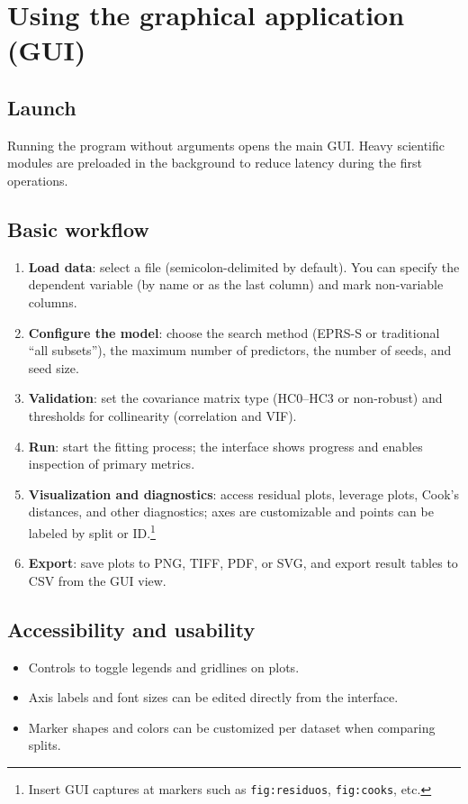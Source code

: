 \documentclass[11pt,a4paper]{article}
\begin{document}
\section{Using the graphical application (GUI)}
\subsection{Launch}
Running the program without arguments opens the main GUI. Heavy scientific modules are preloaded in the background to reduce latency during the first operations.\cite{mlrx-source-main}

\subsection{Basic workflow}
\begin{enumerate}
  \item \textbf{Load data}: select a file (semicolon-delimited by default). You can specify the dependent variable (by name or as the last column) and mark non-variable columns.
  \item \textbf{Configure the model}: choose the search method (EPRS-S or traditional ``all subsets''), the maximum number of predictors, the number of seeds, and seed size.
  \item \textbf{Validation}: set the covariance matrix type (HC0--HC3 or non-robust) and thresholds for collinearity (correlation and VIF).
  \item \textbf{Run}: start the fitting process; the interface shows progress and enables inspection of primary metrics.
  \item \textbf{Visualization and diagnostics}: access residual plots, leverage plots, Cook's distances, and other diagnostics; axes are customizable and points can be labeled by split or ID.\footnote{Insert GUI captures at markers such as \texttt{fig:residuos}, \texttt{fig:cooks}, etc.}
  \item \textbf{Export}: save plots to PNG, TIFF, PDF, or SVG, and export result tables to CSV from the GUI view.
\end{enumerate}

\subsection{Accessibility and usability}
\begin{itemize}
  \item Controls to toggle legends and gridlines on plots.
  \item Axis labels and font sizes can be edited directly from the interface.
  \item Marker shapes and colors can be customized per dataset when comparing splits.
\end{itemize}
\end{document}
